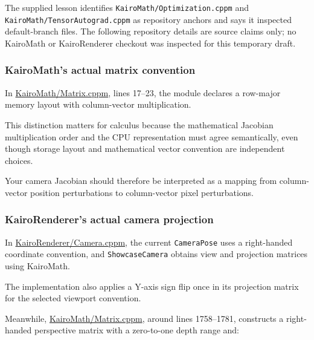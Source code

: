 The supplied lesson identifies \texttt{KairoMath/Optimization.cppm} and \texttt{KairoMath/TensorAutograd.cppm} as repository anchors and says it inspected default-branch files. The following repository details are source claims only; no KairoMath or KairoRenderer checkout was inspected for this temporary draft.

\subsubsection{KairoMath's actual matrix convention}\label{02-foundations-ii-ch021-kairomaths-actual-matrix-convention}

\hypertarget{02-foundations-ii-ch021-kairomaths-actual-matrix-convention}{}

In \href{https://github.com/swayam8624/KairoMath/blob/master/Matrix.cppm?utm_source=chatgpt.com}{KairoMath/Matrix.cppm}, lines 17--23, the module declares a row-major memory layout with column-vector multiplication.

This distinction matters for calculus because the mathematical Jacobian multiplication order and the CPU representation must agree semantically, even though storage layout and mathematical vector convention are independent choices.

Your camera Jacobian should therefore be interpreted as a mapping from column-vector position perturbations to column-vector pixel perturbations.

\subsubsection{KairoRenderer's actual camera projection}\label{02-foundations-ii-ch021-kairorenderers-actual-camera-projection}

\hypertarget{02-foundations-ii-ch021-kairorenderers-actual-camera-projection}{}

In \href{https://github.com/swayam8624/KairoRenderer/blob/main/Camera.cppm?utm_source=chatgpt.com}{KairoRenderer/Camera.cppm}, the current \texttt{CameraPose} uses a right-handed coordinate convention, and \texttt{ShowcaseCamera} obtains view and projection matrices using KairoMath.

The implementation also applies a Y-axis sign flip once in its projection matrix for the selected viewport convention.

Meanwhile, \href{https://github.com/swayam8624/KairoMath/blob/master/Matrix.cppm?utm_source=chatgpt.com}{KairoMath/Matrix.cppm}, around lines 1758--1781, constructs a right-handed perspective matrix with a zero-to-one depth range and:

